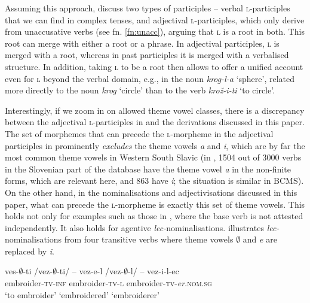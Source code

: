 \documentclass[output=paper,colorlinks,citecolor=brown]{langscibook}
\begin{document}
 Assuming this approach, \citet{simonovicMismas2022} discuss two types of participles -- verbal \textsc{l-}participles that we can find in complex tenses, and adjectival \textsc{l-}participles, which only derive from unaccusative verbs (see fn. \ref{fn:unacc}), arguing that \textsc{l} is a root in both. This root can merge with either a root or  a phrase. In adjectival participles, \textsc{l} is merged with a root, whereas in past participles it is merged with a verbalised structure. In addition, taking \textsc{l} to be a root then allows \citet{simonovicMismas2022} to offer a unified account even for \textsc{l} beyond the verbal domain, e.g., in the noun  \textit{krog-l-a} `sphere', %
related more directly to the noun \textit{krog} `circle' than to the verb \textit{krož-i-ti} `to circle'.

Interestingly, if we zoom in on allowed theme vowel classes, there is a discrepancy between the adjectival \textsc{l}-participles in \citet[]{simonovicMismas2022} and the derivations discussed in this paper. The set of morphemes that can precede the \textsc{l}-morpheme in the adjectival participles in \citet[]{simonovicMismas2022} prominently \textit{excludes} the theme vowels \textit{a} and \textit{i}, which are by far the most common theme vowels in Western South Slavic (in \citealt{WeSoSlaV_inflection}, 1504 out of 3000 verbs in the Slovenian part of the database have the theme vowel \textit{a} in the non-finite forms, which are relevant here, and 863 have \textit{i}; the situation is similar in BCMS). On the other hand, in the nominalisations and adjectivisations discussed in this paper, what can precede the \textsc{l}-morpheme is exactly this set of theme vowels. This holds not only for examples such as those in , where the base verb is not attested independently. It also holds for agentive \textit{lec-}nominalisations.  illustrates \textit{lec-}nominalisations from four transitive verbs where theme vowels $\emptyset$ and \textit{e} are replaced by \textit{i}. 

\ea \label{ex:tvchange1} 
\ea \label{ex:tvchange10}
 \glll ves-$\emptyset$-ti{ }/vez-$\emptyset$-ti/ -- vez-e-l{ }/vez-$\emptyset$-l/ -- vez-i-l-ec   \\
   embroider-\textsc{tv}-\textsc{inf} {} embroider-\textsc{tv}-\textsc{l} {} embroider-\textsc{tv}-\textit{er}.\textsc{nom.sg} \\
  `to{ }embroider' {} `embroidered' {}  `embroiderer' \\
 
\end{document}
